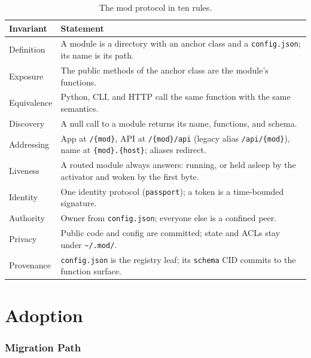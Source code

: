 \documentclass[11pt,a4paper]{article}
\begin{document}
\begin{table}[H]
\centering
\begin{tabularx}{\textwidth}{lX}
\toprule
\textbf{Invariant} & \textbf{Statement} \\
\midrule
Definition & A module is a directory with an anchor class and a \texttt{config.json}; its name is its path. \\
Exposure & The public methods of the anchor class are the module's functions. \\
Equivalence & Python, CLI, and HTTP call the same function with the same semantics. \\
Discovery & A null call to a module returns its name, functions, and schema. \\
Addressing & App at \texttt{/\{mod\}}, API at \texttt{/\{mod\}/api} (legacy alias \texttt{/api/\{mod\}}), name at \texttt{\{mod\}.\{host\}}; aliases redirect. \\
Liveness & A routed module always answers: running, or held asleep by the activator and woken by the first byte. \\
Identity & One identity protocol (\texttt{passport}); a token is a time-bounded signature. \\
Authority & Owner from \texttt{config.json}; everyone else is a confined peer. \\
Privacy & Public code and config are committed; state and ACLs stay under \texttt{\textasciitilde/.mod/}. \\
Provenance & \texttt{config.json} is the registry leaf; its \texttt{schema} CID commits to the function surface. \\
\bottomrule
\end{tabularx}
\caption{The mod protocol in ten rules.}
\end{table}

\part{Adoption}

\section{Migration Path}
\end{document}
